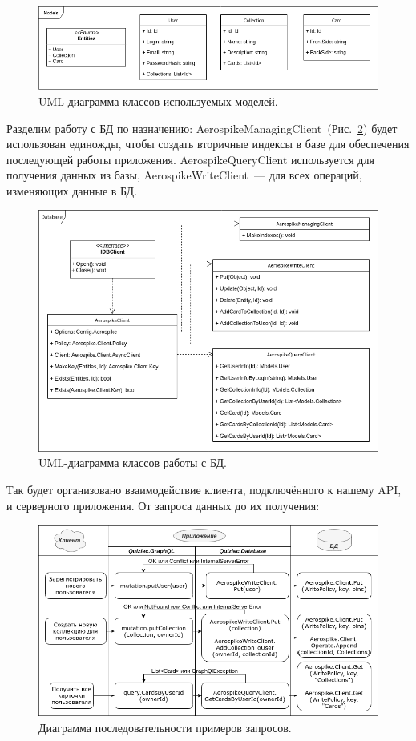 \documentclass[14pt]{matmex-diploma-custom}
\begin{document}
\begin{figure}[ht]
    \includegraphics[width=\textwidth]{Models}
    \caption{UML-диаграмма классов используемых моделей.}
    \label{fig:models}
\end{figure}

Разделим работу с БД по назначению: AerospikeManagingClient~(Рис.~\ref{fig:aeroclient}) будет использован единожды, чтобы создать вторичные индексы в базе для обеспечения последующей работы приложения. AerospikeQueryClient используется для получения данных из базы, AerospikeWriteClient~--- для всех операций, изменяющих данные в БД.

\begin{figure}[ht]
    \includegraphics[width=\textwidth]{Database}
    \caption{UML-диаграмма классов работы с БД.}
    \label{fig:aeroclient}
\end{figure}

Так будет организовано взаимодействие клиента, подключённого к нашему API, и серверного приложения. От запроса данных до их получения:

\begin{figure}[ht]
    \includegraphics[width=\textwidth]{Sequence}
    \caption{Диаграмма последовательности примеров запросов.}
    \label{fig:sequence}
\end{figure}
\end{document}

